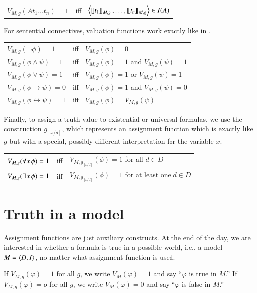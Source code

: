 \documentclass[nobib,nofonts]{tufte-handout}
\newcommand{\proplog}{\acro{PropLog}}
\begin{document}
\medskip

\begin{tabular}{lcl}
  $V_{M,g}(At_1\dots t_n) =1$ & iff & $\left \langle \left [\! \left [ t_1 \right ]\! \right]_{M,g}, \dots, \left [\! \left [ t_n \right ]\! \right]_{M,g}\right\rangle \in I(A)$
\end{tabular}

\medskip

For sentential connectives, valuation functions work exactly like in \proplog.

\medskip

\begin{tabular}{lcl}
  $V_{M,g}(\neg \phi) = 1$ & iff & $V_{M,g}(\phi) =0$\\
  $V_{M,g}(\phi \wedge \psi) = 1$ & iff & $V_{M,g}(\phi) =1$ and $V_{M,g}(\psi) = 1$\\
  $V_{M,g}(\phi \vee \psi) = 1$ & iff & $V_{M,g}(\phi) =1$ or $V_{M,g}(\psi) = 1$\\
  $V_{M,g}(\phi \rightarrow \psi) = 0$ & iff & $V_{M,g}(\phi) =1$ and $V_{M,g}(\psi) = 0$\\
  $V_{M,g}(\phi \leftrightarrow \psi) = 1$ & iff & $V_{M,g}(\phi) = V_{M,g}(\psi)$
\end{tabular}

\medskip

Finally, to assign a truth-value to existential or universal formulas, we use the construction $g_{[x/d]}$, which represents an assignment function which is exactly like $g$ but with a special, possibly different interpretation for the variable $x$.

\medskip

\begin{tabular}{lcl}
  $V_{M,g}(\forall x \thinspace \phi) = 1$ & iff & $V_{M,g_{[x/d]}}(\phi) = 1$ for all $d \in D$\\
  $V_{M,g}(\exists x \thinspace \phi) = 1$ & iff & $V_{M,g_{[x/d]}}(\phi) = 1$ for at least one $d \in D$
\end{tabular}

\section{Truth in a model}

Assignment functions are just auxiliary constructs.
At the end of the day, we are interested in whether a formula is true in a possible world, i.e., a model $M = \left \langle D,I\right\rangle$, no matter what assignment function is used.

If $V_{M,g}(\varphi) = 1$ for all $g$, we write $V_{M}(\varphi) = 1$ and say ``$\varphi$ is true in $M$.''
If $V_{M,g}(\varphi) = o$ for all $g$, we write $V_{M}(\varphi) = 0$ and say ``$\varphi$ is false in $M$.''
\end{document}
